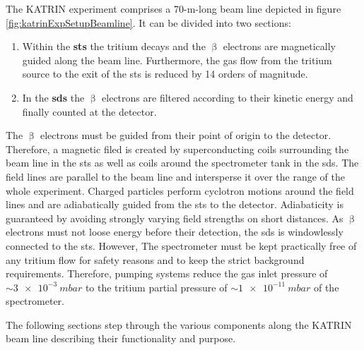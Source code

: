 The KATRIN experiment comprises a 70-m-long beam line depicted in figure \ref{fig:katrinExpSetupBeamline}. It can be divided into two sections: 
\begin{enumerate}
    \item Within the \textbf{\gls{sts}} the tritium decays and the $\upbeta$ electrons are magnetically guided along the beam line. Furthermore, the gas flow from the tritium source to the exit of the \gls{sts} is reduced by 14 orders of magnitude.
    \item In the \textbf{\gls{sds}} the $\upbeta$ electrons are filtered according to their kinetic energy and finally counted at the detector.
\end{enumerate}
The $\upbeta$  electrons  must be guided from their point of origin to the detector. Therefore, a magnetic filed is created by superconducting coils surrounding the beam line in the \gls{sts} as well as coils around the spectrometer tank in the \gls{sds}. The field lines are parallel to the beam line and intersperse it over the range of the whole experiment. Charged particles perform cyclotron motions around the field lines and are adiabatically guided from the \gls{sts} to the detector. Adiabaticity is guaranteed by avoiding strongly varying field strengths on short distances. As $\upbeta$ electrons must not loose energy before their detection, the \gls{sds} is windowlessly connected to the \gls{sts}. However, The spectrometer must be kept practically free of any tritium flow for safety reasons and to keep the strict background requirements. Therefore, pumping systems reduce the gas inlet pressure of $\sim\SI{3e-3}{mbar}$ to the tritium partial pressure of $\sim\SI{1e-11}{mbar}$ of the spectrometer.

The following sections step through the various components along the KATRIN beam line describing their functionality and purpose.

